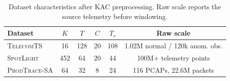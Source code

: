 \begin{table}[t]
  \caption{Dataset characteristics after KAC preprocessing. Raw scale reports the source telemetry before windowing.}
  \label{tab:dataset_stats}
  \small
  \setlength{\tabcolsep}{4pt}
  \begin{tabular}{lccccc}
    \toprule
    Dataset & $K$ & $T$ & $C$ & $T_r$ & Raw scale \\
    \midrule
    \textsc{TelecomTS}    & 16  & 128 & 20 & 108 & 1.02M normal / 120k anom. obs.\\
    \textsc{SpotLight}    & 452 & 64  & 20 & 44  & 100M+ telemetry points \\
    \textsc{ProdTrace-SA} & 64  & 32  & 8  & 24  & 116 PCAPs, 22.6M packets \\
    \bottomrule
  \end{tabular}
\end{table}
